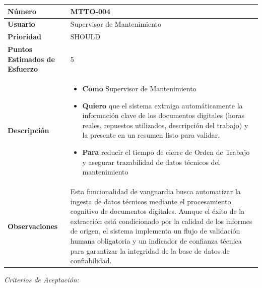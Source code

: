 \begin{longtable}{|p{0.21\textwidth}|p{0.74\textwidth}|}\hline
\textbf{Número} & MTTO-004 \\ \hline
\textbf{Usuario} & Supervisor de Mantenimiento \\ \hline
\textbf{Prioridad} & SHOULD \\ \hline
\textbf{Puntos Estimados de Esfuerzo} & 5 \\ \hline
\textbf{Descripción} & \parbox[t]{\linewidth}{\vspace{2pt}\begin{itemize}[leftmargin=1.5em, nosep, topsep=0pt]
\item \textbf{Como} Supervisor de Mantenimiento
\item \textbf{Quiero} que el sistema extraiga automáticamente la información clave de los documentos digitales (horas reales, repuestos utilizados, descripción del trabajo) y la presente en un resumen listo para validar.
\item \textbf{Para} reducir el tiempo de cierre de Orden de Trabajo y asegurar trazabilidad de datos técnicos del mantenimiento
\end{itemize}\vspace{2pt}} \\ \hline
\textbf{Observaciones} & Esta funcionalidad de vanguardia busca automatizar la ingesta de datos técnicos mediante el procesamiento cognitivo de documentos digitales. Aunque el éxito de la extracción está condicionado por la calidad de los informes de origen, el sistema implementa un flujo de validación humana obligatoria y un indicador de confianza técnica para garantizar la integridad de la base de datos de confiabilidad. \\ \hline
\end{longtable}\normalsize
\noindent\textit{Criterios de Aceptación:}
